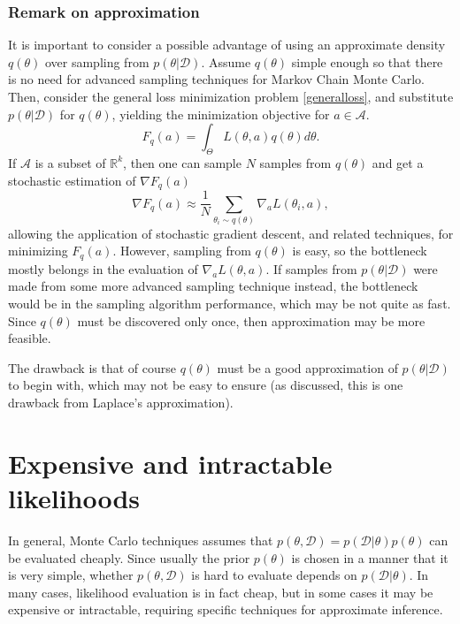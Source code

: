 \subsubsection{Remark on approximation}
It is important to consider a possible advantage of using an approximate density $q(\theta)$ over sampling from $p(\theta|\mathcal{D})$. Assume $q(\theta)$ simple enough so that there is no need for advanced sampling techniques for Markov Chain Monte Carlo. Then, consider the general loss minimization problem \eqref{generalloss}, and substitute $p(\theta|\mathcal{D})$ for $q(\theta)$, yielding the minimization objective for $a \in \mathcal{A}$.
\begin{equation}
 F_q(a) = \int_{\Theta} L(\theta,a) q(\theta) d\theta.
\end{equation}
If $\mathcal{A}$ is a subset of $\mathbb{R}^k$, then one can sample $N$ samples from $q(\theta)$ and get a stochastic estimation of $\nabla F_q(a)$
\begin{equation}
 \nabla F_q(a) \approx \frac{1}{N}\sum_{\theta_i \sim q(\theta)} \nabla_a L(\theta_i,a),
\end{equation}
allowing the application of stochastic gradient descent, and related techniques, for minimizing $F_q(a)$. However, sampling from $q(\theta)$ is easy, so the bottleneck mostly belongs in the evaluation of $\nabla_a L(\theta,a)$. If samples from $p(\theta|\mathcal{D})$ were made from some more advanced sampling technique instead, the bottleneck would be in the sampling algorithm performance, which may be not quite as fast. Since $q(\theta)$ must be discovered only once, then approximation may be more feasible.

The drawback is that of course $q(\theta)$ must be a good approximation of $p(\theta|\mathcal{D})$ to begin with, which may not be easy to ensure (as discussed, this is one drawback from Laplace's approximation).

\section{Expensive and intractable likelihoods}
In general, Monte Carlo techniques assumes that $p(\theta,\mathcal{D}) = p(\mathcal{D}|\theta) p(\theta)$ can be evaluated cheaply. Since usually the prior $p(\theta)$ is chosen in a manner that it is very simple, whether $p(\theta,\mathcal{D})$ is hard to evaluate depends on $p(\mathcal{D}|\theta)$. In many cases, likelihood evaluation is in fact cheap, but in some cases it may be expensive or intractable, requiring specific techniques for approximate inference.

